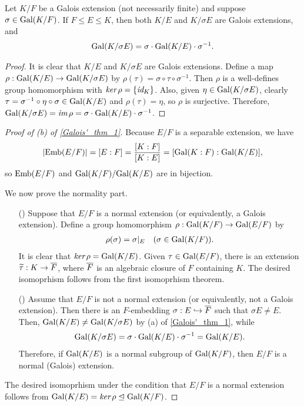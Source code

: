 \begin{prop}
    Let $K/F$ be a Galois extension (not necessarily finite) and suppose $\sigma\in{\textrm{Gal}({K/F})}$.
    If $F\leq E\leq K$, then both $K/E$ and $K/\sigma E$ are Galois extensions, and
    \begin{align*}
        {\textrm{Gal}({K/\sigma E})}=\sigma\cdot{\textrm{Gal}({K/E})}\cdot\sigma^{-1}.
    \end{align*}
\end{prop}
\begin{proof}
    It is clear that $K/E$ and $K/\sigma E$ are Galois extensions.
    Define a map $\rho: {\textrm{Gal}({K/E})}\rightarrow{\textrm{Gal}({K/\sigma E})}$ by $\rho(\tau)=\sigma\circ\tau\circ\sigma^{-1}$.
    Then $\rho$ is a well-defines group homomorphism with $\textit{ker\,}\rho=\{\textit{id}_{K}\}$.
    Also, given $\eta\in{\textrm{Gal}({K/\sigma E})}$, clearly $\tau=\sigma^{-1}\circ\eta\circ\sigma\in{\textrm{Gal}({K/E})}$ and $\rho(\tau)=\eta$, so $\rho$ is surjective.
    Therefore, ${\textrm{Gal}({K/\sigma E})}=\textit{im\,}\rho=\sigma\cdot{\textrm{Gal}({K/E})}\cdot\sigma^{-1}$.
\end{proof}
\begin{proof}[Proof of (b) of \cref{Galois'_thm_1}]
    Because $E/F$ is a separable extension, we have
    \begin{align*}
        |{\textrm{Emb}({E/F})}|=[E:F]=\frac{[K:F]}{[K:E]}=[{\textrm{Gal}({K:F})}: {\textrm{Gal}({K/E})}],
    \end{align*}
    so ${\textrm{Emb}({E/F})}$ and ${\textrm{Gal}({K/F})}/{\textrm{Gal}({K/E})}$ are in bijection.

    We now prove the normality part.
    \begin{enumerate}
        \item[(\romannumeral 1)]
        {
            Suppose that $E/F$ is a normal extension (or equivalently, a Galois extension).
            Define a group homomorphism $\rho: {\textrm{Gal}({K/F})}\rightarrow{\textrm{Gal}({E/F})}$ by
            \begin{align*}
                \rho(\sigma)=\sigma|_E\quad(\sigma\in{\textrm{Gal}({K/F})}).
            \end{align*}
            It is clear that $\textit{ker\,}\rho={\textrm{Gal}({K/E})}$.
            Given $\tau\in{\textrm{Gal}({E/F})}$, there is an extension $\widetilde\tau: K\rightarrow\overline{F}$, where $\overline{F}$ is an algebraic closure of $F$ containing $K$.
            The desired isomoprhism follows from the first isomoprhism theorem.
        }
        \item[(\romannumeral 2)]
        {
            Assume that $E/F$ is not a normal extension (or equivalently, not a Galois extension).
            Then there is an $F$-embedding $\sigma: E\hookrightarrow\overline{F}$ such that $\sigma E\neq E$.
            Then, ${\textrm{Gal}({K/E})}\neq{\textrm{Gal}({K/\sigma E})}$ by (a) of \cref{Galois'_thm_1}, while
            \begin{align*}
                {\textrm{Gal}({K/\sigma E})}=\sigma\cdot{\textrm{Gal}({K/E})}\cdot\sigma^{-1}={\textrm{Gal}({K/E})}.
            \end{align*}
            Therefore, if ${\textrm{Gal}({K/E})}$ is a normal subgroup of ${\textrm{Gal}({K/F})}$, then $E/F$ is a normal (Galois) extension.
        }
    \end{enumerate}
    The desired isomoprhism under the condition that $E/F$ is a normal extension follows from ${\textrm{Gal}({K/E})}=\textit{ker\,}\rho\trianglelefteq{\textrm{Gal}({K/F})}$.
\end{proof}

